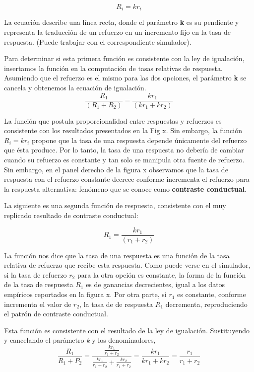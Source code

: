 \documentclass[
  letterpaper,
]{book}
\begin{document}
\[R_i = kr_i\]

La ecuación describe una línea recta, donde el parámetro \textbf{k} es
su pendiente y representa la traducción de un refuerzo en un incremento
fijo en la tasa de respuesta. (Puede trabajar con el correspondiente
simulador).

Para determinar si esta primera función es consistente con la ley de
igualación, insertamos la función en la computación de tasas relativas
de respuesta. Asumiendo que el refuerzo es el mismo para las dos
opciones, el parámetro \textbf{k} se cancela y obtenemos la ecuación de
igualación. \[
\frac{R_1}{(R_1 + R_2)} = \frac{kr_1}{(kr_1 + kr_2)}
\]

La función que postula proporcionalidad entre respuestas y refuerzos es
consistente con los resultados presentados en la Fig x. Sin embargo, la
función \(R_i = kr_i\) propone que la tasa de una respuesta depende
únicamente del refuerzo que ésta produce. Por lo tanto, la tasa de una
respuesta no debería de cambiar cuando su refuerzo es constante y tan
solo se manipula otra fuente de refuerzo. Sin embargo, en el panel
derecho de la figura x observamos que la tasa de respuesta con el
refuerzo constante decrece conforme incrementa el refuerzo para la
respuesta alternativa: fenómeno que se conoce como \textbf{contraste
conductual}.

La siguiente es una segunda función de respuesta, consistente con el muy
replicado resultado de contraste conductual:

\[
R_1 = \frac {kr_1} {(r_1 + r_2)}
\]

La función nos dice que la tasa de una respuesta es una función de la
tasa relativa de refuerzo que recibe esta respuesta. Como puede verse en
el simulador, si la tasa de refuerzo \(r_2\) para la otra opción es
constante, la forma de la función de la tasa de respuesta \(R_1\) es de
ganancias decrecientes, igual a los datos empíricos reportados en la
figura x. Por otra parte, si \(r_1\) es constante, conforme incrementa
el valor de \(r_2\), la tasa de de respuesta \(R_1\) decrementa,
reproduciendo el patrón de contraste conductual.

Esta función es consistente con el resultado de la ley de igualación.
Sustituyendo y cancelando el parámetro \emph{k} y los denominadores,
\begin{equation}
\frac{R_1}{R_1 + P_2} = \frac{\frac{kr_1}{r_1 + r_2}}{\frac{kr_1}{r_1 + r_2} + \frac{kr_2}{r_1 + r_2}} = \frac{kr_1}{kr_1 + kr_2} = \frac{r_1}{r_1 + r_2}
\end{equation}
\end{document}
